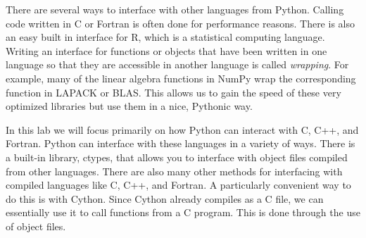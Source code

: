 \newcommand{\of}{\texttt{.o}~}

\label{lab:cythonwrap}



There are several ways to interface with other languages from Python.
Calling code written in C or Fortran is often done for performance reasons.
There is also an easy built in interface for R, which is a statistical computing language.
Writing an interface for functions or objects that have been written in one language so that they are accessible in another language is called \emph{wrapping}.  For example, many of the linear algebra functions in NumPy wrap the corresponding function in LAPACK or BLAS.
This allows us to gain the speed of these very optimized libraries but use them in a nice, Pythonic way.

In this lab we will focus primarily on how Python can interact with C, C++, and Fortran.
Python can interface with these languages in a variety of ways.
There is a built-in library, ctypes, that allows you to interface with object files compiled from other languages.
There are also many other methods for interfacing with compiled languages like C, C++, and Fortran.
A particularly convenient way to do this is with Cython.
Since Cython already compiles as a C file, we can essentially use it to call functions from a C program.
This is done through the use of object files.

